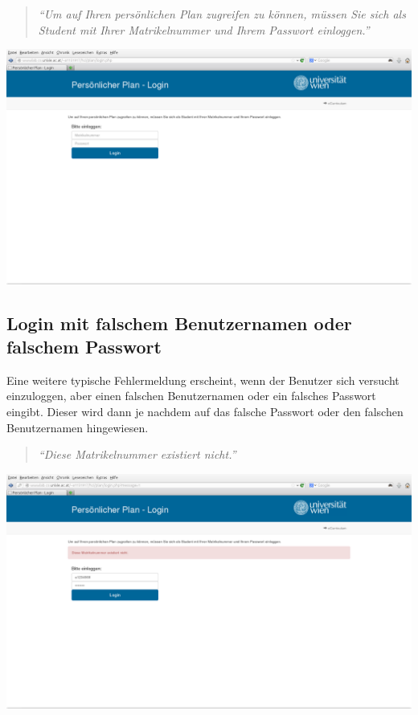 \documentclass[a4paper,10pt]{scrartcl}
\begin{document}
\begin{quote}
 \textit{``Um auf Ihren persönlichen Plan zugreifen zu können, müssen Sie sich als Student mit Ihrer Matrikelnummer und Ihrem Passwort einloggen.''}
\end{quote} 

\begin{center}
 \includegraphics[scale=0.4]{./fehlermeldung1.png}
\end{center}


\subsection{Login mit falschem Benutzernamen oder falschem Passwort}

Eine weitere typische Fehlermeldung erscheint, wenn der Benutzer sich versucht einzuloggen, aber einen falschen Benutzernamen oder ein falsches Passwort eingibt.
Dieser wird dann je nachdem auf das falsche Passwort oder den falschen Benutzernamen hingewiesen.

\begin{quote}
 \textit{``Diese Matrikelnummer existiert nicht.''}
\end{quote} 

\begin{center}
 \includegraphics[scale=0.4]{./fehlermeldung2.png}
\end{center}
\end{document}
